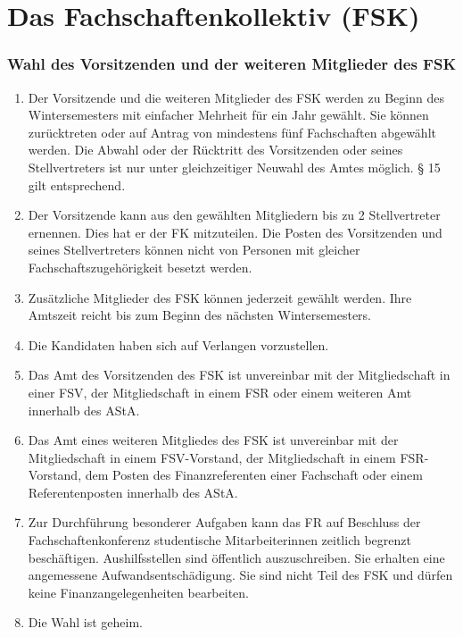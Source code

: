 \documentclass{article}
\begin{document}
\part{Das Fachschaftenkollektiv (FSK)}
\section{Wahl des Vorsitzenden und der weiteren Mitglieder des FSK}
\begin{enumerate}[(1)]
    \item Der Vorsitzende und die weiteren Mitglieder des FSK werden zu Beginn des Wintersemesters mit einfacher Mehrheit für ein Jahr gewählt. 
    	Sie können zurücktreten oder auf Antrag von mindestens fünf Fachschaften abgewählt werden. 
    	Die Abwahl oder der Rücktritt des Vorsitzenden oder seines Stellvertreters ist nur unter gleichzeitiger Neuwahl des Amtes möglich. 
    	§ 15 gilt entsprechend.
    \item Der Vorsitzende kann aus den gewählten Mitgliedern bis zu 2 Stellvertreter ernennen. 
    	Dies hat er der FK mitzuteilen.
    	Die Posten des Vorsitzenden und seines Stellvertreters können nicht von Personen mit gleicher Fachschaftszugehörigkeit besetzt werden.
    \item Zusätzliche Mitglieder des FSK können jederzeit gewählt werden. Ihre Amtszeit reicht bis zum Beginn des nächsten Wintersemesters.
    \item Die Kandidaten haben sich auf Verlangen vorzustellen.
    \item Das Amt des Vorsitzenden des FSK ist unvereinbar mit der Mitgliedschaft in einer FSV, der Mitgliedschaft in einem FSR oder einem weiteren Amt innerhalb des AStA.
    \item Das Amt eines weiteren Mitgliedes des FSK ist unvereinbar mit der Mitgliedschaft in einem FSV-Vorstand, der Mitgliedschaft in einem FSR-Vorstand, dem Posten des Finanzreferenten einer Fachschaft oder einem Referentenposten innerhalb des AStA.
    \item Zur Durchführung besonderer Aufgaben kann das FR auf Beschluss der Fachschaftenkonferenz studentische Mitarbeiterinnen zeitlich begrenzt beschäftigen. Aushilfsstellen sind öffentlich auszuschreiben. 
    	Sie erhalten eine angemessene Aufwandsentschädigung. 
    	Sie sind nicht Teil des FSK und dürfen keine Finanzangelegenheiten bearbeiten.
    \item Die Wahl ist geheim. 
\end{enumerate}
\end{document}
